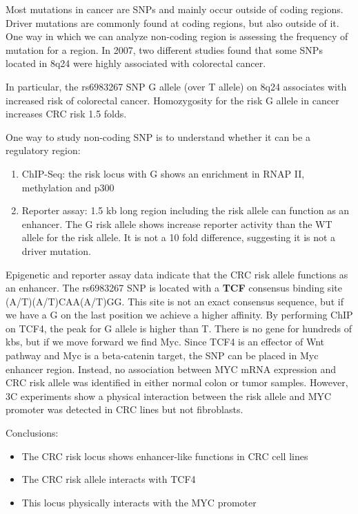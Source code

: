 Most mutations in cancer are SNPs and mainly occur outside of coding regions. Driver mutations are commonly found at coding regions, but also outside of it. One way in which we can analyze non-coding region is assessing the frequency of mutation for a region. In 2007, two different studies found that some SNPs located in 8q24 were highly associated with colorectal cancer.

In particular, the rs6983267 SNP G allele (over T allele) on 8q24 associates with increased risk of colorectal cancer. Homozygosity for the risk G allele in cancer increases CRC risk 1.5 folds.

One way to study non-coding SNP is to understand whether it can be a regulatory region:

\begin{enumerate}
\def\labelenumi{\arabic{enumi}.}
\tightlist
\item
  ChIP-Seq: the risk locus with G shows an enrichment in RNAP II, methylation and p300
\item
  Reporter assay: 1.5 kb long region including the risk allele can function as an enhancer. The G risk allele shows increase reporter activity than the WT allele for the risk allele. It is not a 10 fold difference, suggesting it is not a driver mutation.
\end{enumerate}

Epigenetic and reporter assay data indicate that the CRC risk allele functions as an enhancer.
The rs6983267 SNP is located with a \textbf{TCF} consensus binding site (A/T)(A/T)CAA(A/T)GG. This site is not an exact consensus sequence, but if we have a G on the last position we achieve a higher affinity. By performing ChIP on TCF4, the peak for G allele is higher than T. There is no gene for hundreds of kbs, but if we move forward we find Myc. Since TCF4 is an effector of Wnt pathway and Myc is a beta-catenin target, the SNP can be placed in Myc enhancer region. Instead, no association between MYC mRNA expression and CRC risk allele was identified in either normal colon or tumor samples. However, 3C experiments show a physical interaction between the risk allele and MYC promoter was detected in CRC lines but not fibroblasts.

Conclusions:

\begin{itemize}
\tightlist
\item
  The CRC risk locus shows enhancer-like functions in CRC cell lines
\item
  The CRC risk allele interacts with TCF4
\item
  This locus physically interacts with the MYC promoter
\end{itemize}

